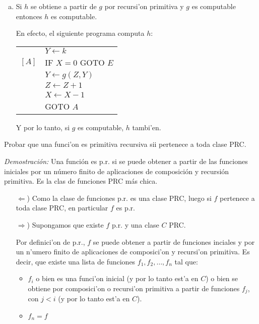 \begin{questions}
\begin{solution}
\begin{enumerate}[(a)]
  \item Si $h$ se obtiene a partir de $g$ por recursi'on primitiva y $g$ es computable entonces $h$ es computable. 
  
  En efecto, el siguiente programa computa $h$: 
  
  \vspace{0.5cm}
  \begin{tabular}{rl}
	  & $Y \leftarrow k$ \\ 
    $[A]$ & IF $X=0$ GOTO $E$ \\
	  & $Y \leftarrow g(Z,Y)$ \\
	  & $Z \leftarrow Z+1$ \\
	  & $X \leftarrow X-1$ \\
	  & GOTO $A$
  \end{tabular}
  \vspace{0.5cm}
  
  Y por lo tanto, si $g$ es computable, $h$ tambi'en. 
  \end{enumerate}
\end{solution}

\question Probar que una funci'on es primitiva recursiva sii pertenece a toda clase PRC.
\begin{solution}
  
  {\it Demostraci\'on: } Una funci\'on es p.r. si se puede obtener a partir de las funciones iniciales por un n\'umero finito de aplicaciones de composici\'on y recursi\'on primitiva. Es la clas de funciones PRC m\'as chica. 
  
  \begin{itemize}
   \item[$\Leftarrow$)] Como la clase de funciones p.r. es una clase PRC, luego si $f$ pertenece a toda clase PRC, en particular $f$ es p.r.
   
   \item[$\Rightarrow$)] Supongamos que existe $f$ p.r. y una clase $C$ PRC. 

    Por definici'on de p.r., $f$ se puede obtener a partir de funciones inciales y por un n'umero finito de aplicaciones de composici'on y recursi'on primitiva. Es decir, que existe una lista de funciones $f_1, f_2, \dots, f_n$ tal que: 

    \begin{itemize}
    \item $f_i$ o bien es una funci'on inicial (y por lo tanto est'a en $C$) o bien se obtiene por composici'on o recursi'on primitiva a partir de funciones $f_j$, con $j < i$ (y por lo tanto est'a en $C$). 
    \item $f_n = f$
    \end{itemize}


\end{itemize}
\end{solution}
\end{questions}
